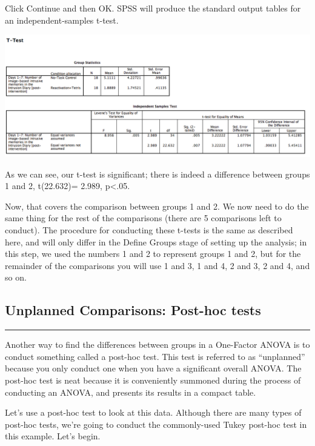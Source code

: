 \documentclass[
]{book}
\begin{document}
Click {Continue} and then {OK}. SPSS will produce the standard output tables for an independent-samples t-test.

\includegraphics{img/8.4.19.png}

As we can see, our t-test is significant; there is indeed a difference between groups 1 and 2, t(22.632)= 2.989, p\textless.05.

Now, that covers the comparison between groups 1 and 2. We now need to do the same thing for the rest of the comparisons (there are 5 comparisons left to conduct). The procedure for conducting these t-tests is the same as described here, and will only differ in the {Define Groups} stage of setting up the analysis; in this step, we used the numbers 1 and 2 to represent groups 1 and 2, but for the remainder of the comparisons you will use 1 and 3, 1 and 4, 2 and 3, 2 and 4, and so on.

\hypertarget{unplanned-comparisons-post-hoc-tests}{%
\subsection{Unplanned Comparisons: Post-hoc tests}\label{unplanned-comparisons-post-hoc-tests}}

\begin{center}\rule{0.5\linewidth}{0.5pt}\end{center}

Another way to find the differences between groups in a One-Factor ANOVA is to conduct something called a post-hoc test. This test is referred to as ``unplanned'' because you only conduct one when you have a significant overall ANOVA. The post-hoc test is neat because it is conveniently summoned during the process of conducting an ANOVA, and presents its results in a compact table.

Let's use a post-hoc test to look at this data. Although there are many types of post-hoc tests, we're going to conduct the commonly-used Tukey post-hoc test in this example. Let's begin.
\end{document}

